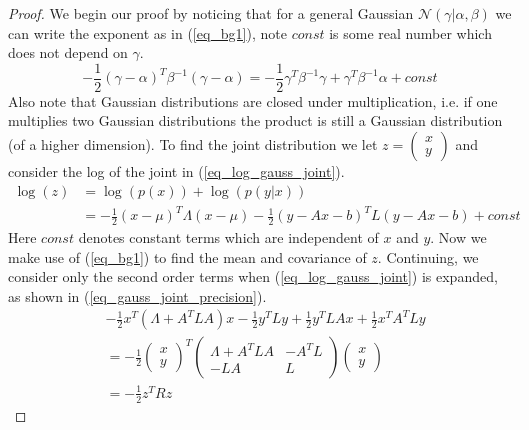 \begin{proof}
We begin our proof by noticing that for a general Gaussian $\mathcal{N}(\gamma|\alpha, \beta)$ we can write the exponent as in (\ref{eq_bg1}), note $const$ is some real number which does not depend on $\gamma$.
\begin{equation}
-\frac{1}{2}\left(\gamma-\alpha \right)^T\beta^{-1}\left(\gamma-\alpha \right) = -\frac{1}{2}\gamma^T\beta^{-1}\gamma +\gamma^T\beta^{-1}\alpha + const
\label{eq_bg1} 
\end{equation}
Also note that Gaussian distributions are closed under multiplication, i.e. if one multiplies two Gaussian distributions the product is still a Gaussian distribution (of a higher dimension). To find the joint distribution we let $z = \begin{pmatrix}
x \\ y
\end{pmatrix}$ and consider the log of the joint in (\ref{eq_log_gauss_joint}).
\begin{equation}
\begin{aligned}
\log(z) &= \log(p(x)) + \log(p(y|x))\\
&=  -\frac{1}{2}(x-\mu)^T\Lambda(x-\mu) -\frac{1}{2}(y-Ax-b)^T L(y-Ax-b) + const
\end{aligned}
\label{eq_log_gauss_joint}
\end{equation}
Here $const$ denotes constant terms which are independent of $x$ and $y$. Now we make use of (\ref{eq_bg1}) to find the mean and covariance of $z$. Continuing, we consider only the second order terms when (\ref{eq_log_gauss_joint}) is expanded, as shown in (\ref{eq_gauss_joint_precision}).
\begin{equation}
\begin{aligned}
&-\frac{1}{2}x^T(\Lambda+A^TLA)x-\frac{1}{2}y^TLy + \frac{1}{2}y^TLAx+\frac{1}{2}x^TA^TLy \\
&= -\frac{1}{2}\begin{pmatrix}
x \\ y
\end{pmatrix}^T \begin{pmatrix}
\Lambda+A^TLA & -A^TL \\ -LA & L
\end{pmatrix}\begin{pmatrix}
x \\ y
\end{pmatrix} \\
&= -\frac{1}{2}z^TRz
\end{aligned}
\label{eq_gauss_joint_precision}

\end{equation}
\end{proof}
